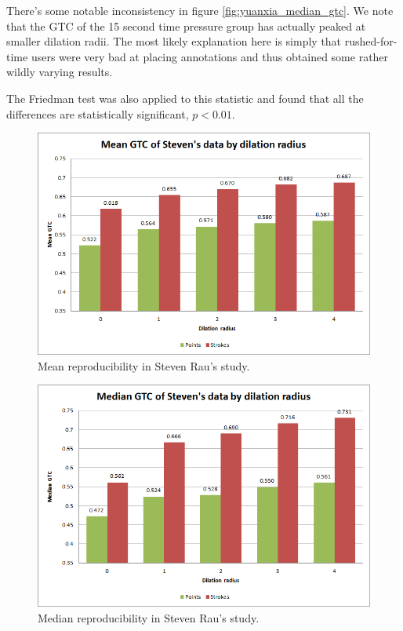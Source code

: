 \documentclass[12pt,a4paper,notitlepage]{article}
\begin{document}
There's some notable inconsistency in figure \ref{fig:yuanxia_median_gtc}. We note that the GTC of the 15 second time pressure group has actually peaked at smaller dilation radii. The most likely explanation here is simply that rushed-for-time users were very bad at placing annotations and thus obtained some rather wildly varying results.

The Friedman test was also applied to this statistic and found that all the differences are statistically significant, $p < 0.01$.

\begin{figure}[H]
	\includegraphics[width=.9\linewidth]{steven_mean_gtc}
	\caption{Mean reproducibility in Steven Rau's study.}
	\label{fig:steven_mean_gtc}
\end{figure}

\begin{figure}[H]
	\includegraphics[width=.9\linewidth]{steven_median_gtc}
	\caption{Median reproducibility in Steven Rau's study.}
	\label{fig:steven_median_gtc}
\end{figure}
\end{document}
